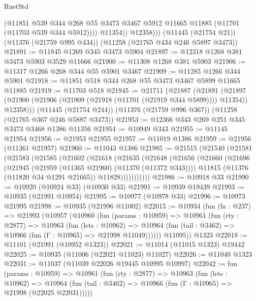 \begin{lexlean}{RustStd}
\begin{coremodule}
{{{{{{{{{{{{{{{{{{{                (@11851
                  @539
                  @344
                  @268
                  @55
                  @3473
                  @3467
                  @5912
                  @11665
                  @11885
                  (@11701 (@11703 @539 @344 @5912))))
              @11354))
          @12358)))
    (@11445 (@21754 @21))
    (@11376 (@21759 @995 @434))
    (@11258 (@21765 @434 @246 @5897 @3473))
@21891 := @11845 @1269 @345 @3473 @5904
@21897 := @12318 @1268 @381 @3473 @5903 @3529 @11666
@21900 := @11308 @1268 @381 @5903
@21906 := @11317 @1266 @268 @344 @55 @5901 @3467
@21909 := @11285 @1266 @344 @5901
@21918 := @11851 @518 @344 @268 @55 @3473 @3467 @5899 @11665 @11885
@21919 := @11703 @518
@21945 := @21711
    (@21887
      (@21891
        (@21897 (@21900 (@21906 (@21909 (@21918 (@11701 (@21919 @344 @5899)))) @11354)) @12358)))
    (@11445 (@21754 @244))
    (@11376 (@21759 @996 @367))
    (@11258 (@21765 @367 @246 @5887 @3473))
@21953 := @12366 @343 @269 @251 @345 @3473 @3468 @1386 @11356
@21954 := @10949 @343
@21955 := @11145 @21954
@21956 := @21953 @21955
@21957 := @11019 @1386
@21959 := @21956 (@11361 @21957)
@21960 := @11043 @1386
@21985 := @21515
    (@21540
      (@21581
        (@21583
          (@21585
            (@21602
              (@21618
                (@21635
                  (@21648
                    (@21656
                      (@21660
                        (@21696
                          (@21945 (@21959 (@11365 @21960) (@11370 (@11372 @343))))
                          @11815
                          (@11376 (@11820 @34 @1291 @21665))
                          @11828)))))))))))
@21986 := @10918 @33
@21990 := @10920 (@10924 @33) (@10930 @33)
@21991 := @10939 @19439
@21993 := @10935 (@21991 @10954)
@21995 := @10977 (@10978 @33)
@21996 := @10973 @21995
@21998 := @10935 (@21996 @11002)
@22015 := @10934
    (fun (fn : @237) =>
    @21993
      (@10957
        (@10960
          (fun (params : @10959) =>
          @10961
            (fun (rty : @2877) =>
            @10963
              (fun (lets : @10962) =>
              @10964 (fun (tail : @3462) => @10966 (fun (Γ : @10965) => @21998 @11049))))))
        @11095))
    @1323
@22018 := @11101 (@21991 (@10952 @1323))
@22021 := @11014 (@11015 @1323) @19442
@22025 := @10935 (@11006 (@22021 @11023) @11027)
@22026 := @11040 @1323
@22031 := @11037 (@11039 @22026 @19445 @10995 @10997)
@22042 := fun (params : @10959) =>
  @10961
    (fun (rty : @2877) =>
    @10963
      (fun (lets : @10962) =>
      @10964 (fun (tail : @3462) => @10966 (fun (Γ : @10965) => @21998 (@22025 @22031)))))
}}}}}}}}}}}}}}}}}}}
\end{coremodule}
\end{lexlean}
